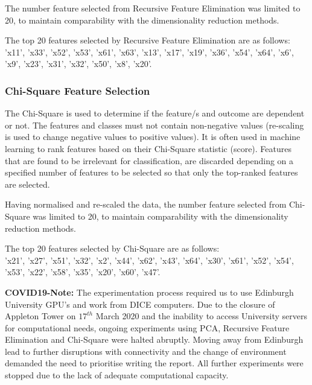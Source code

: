 The number feature selected from Recursive Feature Elimination was limited to 20, to maintain comparability with the dimensionality reduction methods.

The top 20 features selected by Recursive Feature Elimination are as follows: \\
'x11', 'x33', 'x52', 'x53', 'x61', 'x63', 'x13', 'x17', 'x19', 'x36', 'x54', 'x64', 'x6', 'x9', 'x23', 'x31', 'x32', 'x50', 'x8', 'x20'.


\subsubsection{Chi-Square Feature Selection}
\label{sec:chi2}
The Chi-Square \cite{jin2006machine} is used to determine if the feature/s and outcome are dependent or not. The features and classes must not contain non-negative values (re-scaling is used to change negative values to positive values). It is often used in machine learning to rank features based on their Chi-Square statistic (score). Features that are found to be irrelevant for classification, are discarded depending on a specified number of features to be selected so that only the top-ranked features are selected.

Having normalised and re-scaled the data, the number feature selected from Chi-Square was limited to 20, to maintain comparability with the dimensionality reduction methods.

The top 20 features selected by Chi-Square are as follows: \\ 'x21', 'x27', 'x51', 'x32', 'x2', 'x44', 'x62', 'x43', 'x64', 'x30', 'x61', 'x52', 'x54', 'x53', 'x22', 'x58', 'x35', 'x20', 'x60', 'x47'.

\textbf{COVID19-Note:} 
The experimentation process required us to use Edinburgh University GPU's and work from DICE computers. Due to the closure of Appleton Tower on $17^{th}$ March 2020 and the inability to access University servers for computational needs, ongoing experiments using PCA, Recursive Feature Elimination and Chi-Square were halted abruptly.
Moving away from Edinburgh lead to further disruptions with connectivity and the change of environment demanded the need to prioritise writing the report. All further experiments were stopped due to the lack of adequate computational capacity.



